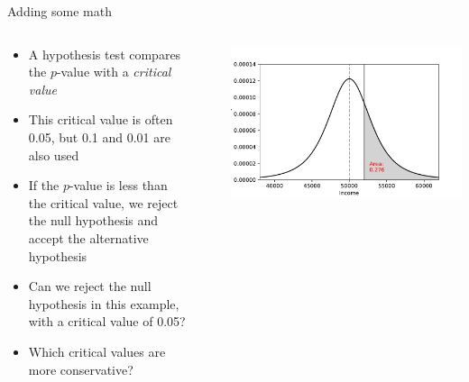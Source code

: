 \begin{frame}{Adding some math}
  \begin{columns}
    \begin{column}{0.5\textwidth}
      \begin{itemize}
        \item A hypothesis test compares the $p$-value with a \emph{critical value}
        \item This critical value is often 0.05, but 0.1 and 0.01 are also used
        \item If the $p$-value is less than the critical value, we reject the null hypothesis and accept the alternative hypothesis
        \item Can we reject the null hypothesis in this example, with a critical value of 0.05?
        \item Which critical values are more conservative?
      \end{itemize}
    \end{column}~%
    \begin{column}{0.49\textwidth}
      \centering\includegraphics[width=\textwidth]{fig/incdistribution_area.pdf}
    \end{column}
  \end{columns}
\end{frame}

